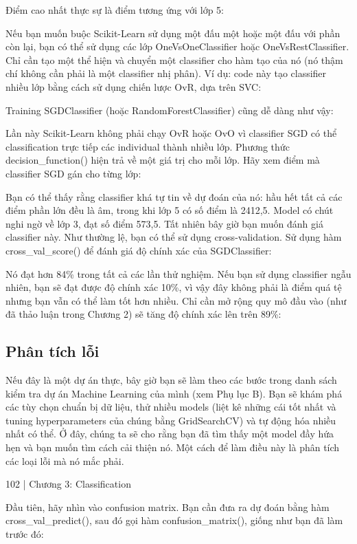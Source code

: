 Điểm cao nhất thực sự là điểm tương ứng với lớp 5:

Nếu bạn muốn buộc Scikit-Learn sử dụng một đấu một hoặc một đấu với phần còn lại, bạn có thể sử dụng các lớp OneVsOneClassifier hoặc OneVsRestClassifier. Chỉ cần tạo một thể hiện và chuyển một classifier cho hàm tạo của nó (nó thậm chí không cần phải là một classifier nhị phân). Ví dụ: code này tạo classifier nhiều lớp bằng cách sử dụng chiến lược OvR, dựa trên SVC:

Training SGDClassifier (hoặc RandomForestClassifier) cũng dễ dàng như vậy:

Lần này Scikit-Learn không phải chạy OvR hoặc OvO vì classifier SGD có thể classification trực tiếp các individual thành nhiều lớp. Phương thức decision\_function() hiện trả về một giá trị cho mỗi lớp. Hãy xem điểm mà classifier SGD gán cho từng lớp:

Bạn có thể thấy rằng classifier khá tự tin về dự đoán của nó: hầu hết tất cả các điểm phần lớn đều là âm, trong khi lớp 5 có số điểm là 2412,5. Model có chút nghi ngờ về lớp 3, đạt số điểm 573,5. Tất nhiên bây giờ bạn muốn đánh giá classifier này. Như thường lệ, bạn có thể sử dụng cross-validation. Sử dụng hàm cross\_val\_score() để đánh giá độ chính xác của SGDClassifier:

Nó đạt hơn 84\% trong tất cả các lần thử nghiệm. Nếu bạn sử dụng classifier ngẫu nhiên, bạn sẽ đạt được độ chính xác 10\%, vì vậy đây không phải là điểm quá tệ nhưng bạn vẫn có thể làm tốt hơn nhiều. Chỉ cần mở rộng quy mô đầu vào (như đã thảo luận trong Chương 2) sẽ tăng độ chính xác lên trên 89\%:

\subsection{Phân tích lỗi}

Nếu đây là một dự án thực, bây giờ bạn sẽ làm theo các bước trong danh sách kiểm tra dự án Machine Learning của mình (xem Phụ lục B). Bạn sẽ khám phá các tùy chọn chuẩn bị dữ liệu, thử nhiều models (liệt kê những cái tốt nhất và tuning hyperparameters của chúng bằng GridSearchCV) và tự động hóa nhiều nhất có thể. Ở đây, chúng ta sẽ cho rằng bạn đã tìm thấy một model đầy hứa hẹn và bạn muốn tìm cách cải thiện nó. Một cách để làm điều này là phân tích các loại lỗi mà nó mắc phải.

102 | Chương 3: Classification

Đầu tiên, hãy nhìn vào confusion matrix. Bạn cần đưa ra dự đoán bằng hàm cross\_val\_predict(), sau đó gọi hàm confusion\_matrix(), giống như bạn đã làm trước đó:

